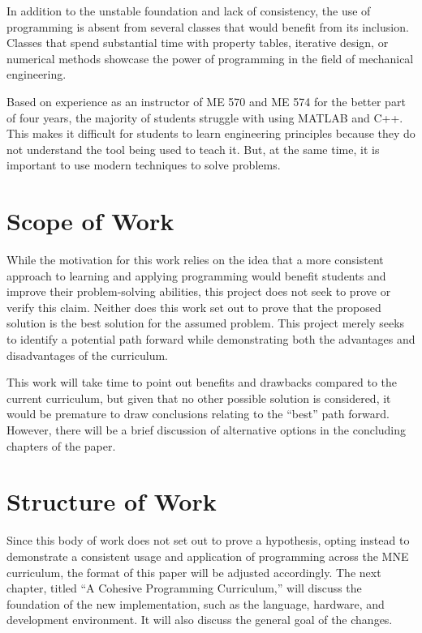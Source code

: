 In addition to the unstable foundation and lack of consistency, the use of programming is 
absent from several classes that would benefit from its inclusion. Classes that spend
substantial time with property tables, iterative design, or numerical methods
showcase the power of programming in the field of mechanical engineering. 

Based on experience as an instructor of ME 570 and ME 574 for the better part of 
four years, the majority of students struggle with using MATLAB and C++. This makes it 
difficult for students to learn engineering principles because they do not understand 
the tool being used to teach it. But, at the same time, it is important to use modern
techniques to solve problems.

\section{Scope of Work}

While the motivation for this work relies on the idea that a more consistent approach to
learning and applying programming would benefit students and improve their problem-solving
abilities, this project does not seek to prove or verify this claim. Neither does this
work set out to prove that the proposed solution is the best solution for the assumed
problem. This project merely seeks to identify a potential path forward while 
demonstrating both the advantages and disadvantages of the curriculum. 

This work will take time to point out benefits and drawbacks compared to the current 
curriculum, but given that no other possible solution is considered, it would be
premature to draw conclusions relating to the ``best'' path forward. However, there 
will be a brief discussion of alternative options in the concluding chapters of the paper.

\section{Structure of Work}

Since this body of work does not set out to prove a hypothesis, opting instead to demonstrate
a consistent usage and application of programming across the MNE curriculum, the format of
this paper will be adjusted accordingly. The next chapter, titled ``A Cohesive Programming
Curriculum,'' will discuss the foundation of the new implementation, such as the language,
hardware, and development environment. It will also discuss the general goal of the changes.

